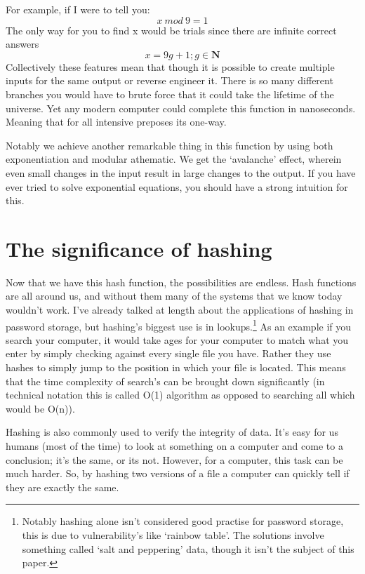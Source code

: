 \documentclass[11pt, oneside]{article}   	%
\begin{document}
For example, if I were to tell you:
\begin{equation}
    x\ mod\ 9 = 1
\end{equation}
The only way for you to find x would be trials since there are infinite correct answers
\begin{equation}
    x = 9g + 1; g \in \mathbf{N}
\end{equation}
Collectively these features mean that though it is possible to create multiple inputs for the same output or reverse engineer it. There is so many different branches you would have to brute force that it could take the lifetime of the universe. Yet any modern computer could complete this function in nanoseconds. Meaning that for all intensive preposes its one-way.

Notably we achieve another remarkable thing in this function by using both exponentiation and modular athematic. We get the ‘avalanche’ effect, wherein even small changes in the input result in large changes to the output. If you have ever tried to solve exponential equations, you should have a strong intuition for this.

\section{The significance of hashing}

Now that we have this hash function, the possibilities are endless. Hash functions are all around us, and without them many of the systems that we know today wouldn’t work. I’ve already talked at length about the applications of hashing in password storage, but hashing’s biggest use is in lookups.\footnote{Notably hashing alone isn’t considered good practise for password storage, this is due to vulnerability’s like ‘rainbow table’. The solutions involve something called ‘salt and peppering’ data, though it isn’t the subject of this paper.} As an example if you search your computer, it would take ages for your computer to match what you enter by simply checking against every single file you have. Rather they use hashes to simply jump to the position in which your file is located. This means that the time complexity of search’s can be brought down significantly (in technical notation this is called O(1) algorithm as opposed to searching all which would be O(n)).

Hashing is also commonly used to verify the integrity of data. It’s easy for us humans (most of the time) to look at something on a computer and come to a conclusion; it’s the same, or its not. However, for a computer, this task can be much harder. So, by hashing two versions of a file a computer can quickly tell if they are exactly the same.
\end{document}
